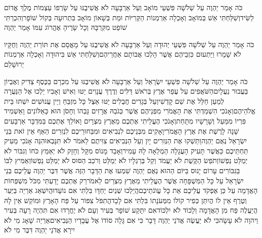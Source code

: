 \documentclass[../main/main.tex]{subfiles}
\begin{document}
\begin{multicols}{\ncols}
כֹּה אָמַר יַהְוֶה עַל שְׁלֹשָׁה פִּשְׁעֵי מוֹאָב וְעַל אַרְבָּעָה לֹא אֲשִׁיבֶנּוּ עַל שָׂרְפוֹ עַצְמוֹת מֶלֶךְ אֱדוֹם לַשִּׂיד\PreVerseSpace{}וְשִׁלַּחְתִּי אֵשׁ בְּמוֹאָב וְאָכְלָה אַרְמְנוֹת הַקְּרִיּוֹת וּמֵת בְּשָׁאוֹן מוֹאָב בִּתְרוּעָה בְּקוֹל שׁוֹפָר\PreVerseSpace{}וְהִכְרַתִּי שׁוֹפֵט מִקִּרְבָּהּ וְכָל שָׂרֶיהָ אֶהֱרוֹג עִמּוֹ אָמַר יַהְוֶה\OpenSection{}\par
{}כֹּה אָמַר יַהְוֶה עַל שְׁלֹשָׁה פִּשְׁעֵי יְהוּדָה וְעַל אַרְבָּעָה לֹא אֲשִׁיבֶנּוּ עַל מָאֳסָם אֶת תּוֹרַת יַהְוֶה וְחֻקָּיו לֹא שָׁמָרוּ וַיַּתְעוּם כִּזְבֵיהֶם אֲשֶׁר הָלְכוּ אֲבוֹתָם אַחֲרֵיהֶם\PreVerseSpace{}וְשִׁלַּחְתִּי אֵשׁ בִּיהוּדָה וְאָכְלָה אַרְמְנוֹת יְרוּשָׁלֵם\OpenSection{}\par
{}כֹּה אָמַר יַהְוֶה עַל שְׁלֹשָׁה פִּשְׁעֵי יִשְׂרָאֵל וְעַל אַרְבָּעָה לֹא אֲשִׁיבֶנּוּ עַל מִכְרָם בַּכֶּסֶף צַדִּיק וְאֶבְיוֹן בַּעֲבוּר נַעֲלָיִם\PreVerseSpace{}הַשֹּׁאֲפִים עַל עֲפַר אֶרֶץ בְּרֹאשׁ דַּלִּים וְדֶרֶךְ עֲנָוִים יַטּוּ וְאִישׁ וְאָבִיו יֵלְכוּ אֶל הַנַּעֲרָה לְמַעַן חַלֵּל אֶת שֵׁם קָדְשִׁי\PreVerseSpace{}וְעַל בְּגָדִים חֲבֻלִים יַטּוּ אֵצֶל כָּל מִזְבֵּחַ וְיֵין עֲנוּשִׁים יִשְׁתּוּ בֵּית אֱלֹהֵיהֶם\PreVerseSpace{}וְאָנֹכִי הִשְׁמַדְתִּי אֶת הָאֱמֹרִי מִפְּנֵיהֶם אֲשֶׁר כְּגֹבַהּ אֲרָזִים גָּבְהוֹ וְחָסֹן הוּא כָּאַלּוֹנִים וָאַשְׁמִיד פִּרְיוֹ מִמַּעַל וְשָׁרָשָׁיו מִתָּחַת\PreVerseSpace{}וְאָנֹכִי הֶעֱלֵיתִי אֶתְכֶם מֵאֶרֶץ מִצְרָיִם וָאוֹלֵךְ אֶתְכֶם בַּמִּדְבָּר אַרְבָּעִים שָׁנָה לָרֶשֶׁת אֶת אֶרֶץ הָאֱמֹרִי\PreVerseSpace{}וָאָקִים מִבְּנֵיכֶם לִנְבִיאִים וּמִבַּחוּרֵיכֶם לִנְזִרִים הַאַף אֵין זֹאת בְּנֵי יִשְׂרָאֵל נְאֻם יַהְוֶה\PreVerseSpace{}וַתַּשְׁקוּ אֶת הַנְּזִרִים יָיִן וְעַל הַנְּבִיאִים צִוִּיתֶם לֵאמֹר לֹא תִּנָּבְאוּ\PreVerseSpace{}הִנֵּה אָנֹכִי מֵעִיק תַּחְתֵּיכֶם כַּאֲשֶׁר תָּעִיק הָעֲגָלָה הַמְלֵאָה לָהּ עָמִיר\PreVerseSpace{}וְאָבַד מָנוֹס מִקָּל וְחָזָק לֹא יְאַמֵּץ כֹּחוֹ וְגִבּוֹר לֹא יְמַלֵּט נַפְשׁוֹ\PreVerseSpace{}וְתֹפֵשׂ הַקֶּשֶׁת לֹא יַעֲמֹד וְקַל בְּרַגְלָיו לֹא יְמַלֵּט וְרֹכֵב הַסּוּס לֹא יְמַלֵּט נַפְשׁוֹ\PreVerseSpace{}וְאַמִּיץ לִבּוֹ בַּגִּבּוֹרִים עָרוֹם יָנוּס בַּיּוֹם הַהוּא נְאֻם יַהְוֶה \ClosedSection{}שִׁמְעוּ אֶת הַדָּבָר הַזֶּה אֲשֶׁר דִּבֶּר יַהְוֶה עֲלֵיכֶם בְּנֵי יִשְׂרָאֵל עַל כָּל הַמִּשְׁפָּחָה אֲשֶׁר הֶעֱלֵיתִי מֵאֶרֶץ מִצְרַיִם לֵאמֹר\PreVerseSpace{}רַק אֶתְכֶם יָדַעְתִּי מִכֹּל מִשְׁפְּחוֹת הָאֲדָמָה עַל כֵּן אֶפְקֹד עֲלֵיכֶם אֵת כָּל עֲוֺנֹתֵיכֶם\PreVerseSpace{}הֲיֵלְכוּ שְׁנַיִם יַחְדָּו בִּלְתִּי אִם נוֹעָדוּ\PreVerseSpace{}הֲיִשְׁאַג אַרְיֵה בַּיַּעַר וְטֶרֶף אֵין לוֹ הֲיִתֵּן כְּפִיר קוֹלוֹ מִמְּעֹנָתוֹ בִּלְתִּי אִם לָכָד\PreVerseSpace{}הֲתִפֹּל צִפּוֹר עַל פַּח הָאָרֶץ וּמוֹקֵשׁ אֵין לָהּ הֲיַעֲלֶה פַּח מִן הָאֲדָמָה וְלָכוֹד לֹא יִלְכּוֹד\PreVerseSpace{}אִם יִתָּקַע שׁוֹפָר בְּעִיר וְעָם לֹא יֶחֱרָדוּ אִם תִּהְיֶה רָעָה בְּעִיר וַיהוָה לֹא עָשָׂה\PreVerseSpace{}כִּי לֹא יַעֲשֶׂה אֲדֹנַי יַהְוֶה דָּבָר כִּי אִם גָּלָה סוֹדוֹ אֶל עֲבָדָיו הַנְּבִיאִים\PreVerseSpace{}אַרְיֵה שָׁאָג מִי לֹא יִירָא אֲדֹנַי יַהְוֶה דִּבֶּר מִי לֹא 
\end{multicols}
\end{document}
